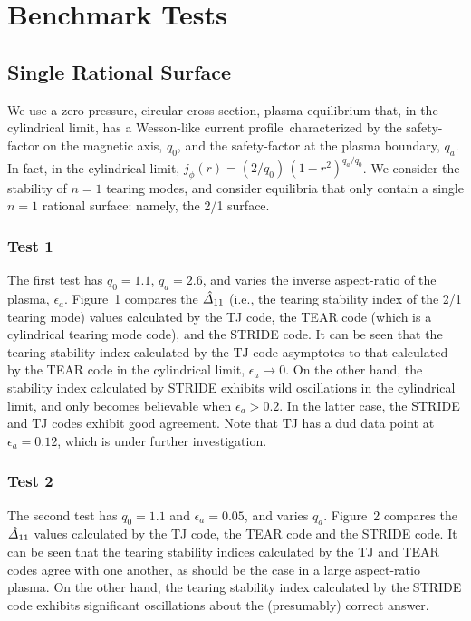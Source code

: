 \documentclass[12pt,prb,aps,notitlepage]{revtex4-1}
\begin{document}
\section{Benchmark Tests}
\subsection{Single Rational Surface}
We use a zero-pressure, circular cross-section,  plasma equilibrium that, in the cylindrical limit, has a Wesson-like current profile\,\cite{wesson} characterized by the
safety-factor on the magnetic axis, $q_0$, and the safety-factor at the plasma boundary, $q_a$. In fact, in the cylindrical limit, $j_\phi(r)= (2/q_0)\, (1-r^2)^{q_a/q_0}$. 
We consider the stability of $n=1$ tearing modes, and
consider equilibria that only contain a single $n=1$ rational surface: namely, the 2/1 surface. 

\subsubsection{Test 1}
The first test has $q_0=1.1$, $q_a=2.6$, and varies the inverse aspect-ratio of the plasma, $\epsilon_a$. Figure~1 compares the $\hat{\mit\Delta}_{11}$ (i.e.,
the tearing stability index of the 2/1 tearing mode) values calculated by the TJ code,\cite{tj} the TEAR code (which is a cylindrical tearing mode code), and
the STRIDE code. It can be seen that the tearing stability index calculated by the TJ code asymptotes to that calculated by the TEAR code
in the cylindrical limit, $\epsilon_a\rightarrow 0$. On the other hand, the stability index calculated by STRIDE exhibits wild oscillations in
the cylindrical limit, and only becomes believable when $\epsilon_a>0.2$. In the latter case, the STRIDE and TJ codes exhibit good agreement. 
Note that TJ has a dud data point at $\epsilon_a=0.12$, which is under further investigation. 

\subsubsection{Test 2}
The second test has $q_0=1.1$ and $\epsilon_a=0.05$, and varies $q_a$. Figure~2 compares the $\hat{\mit\Delta}_{11}$ values calculated by the TJ code, the TEAR code and
the STRIDE code. It can be seen that the tearing stability indices calculated by the TJ and TEAR codes agree with one another, as should be the case in a large aspect-ratio plasma. 
On the other hand, the tearing stability index calculated by the STRIDE code exhibits significant oscillations about the (presumably) correct answer. 
\end{document}
